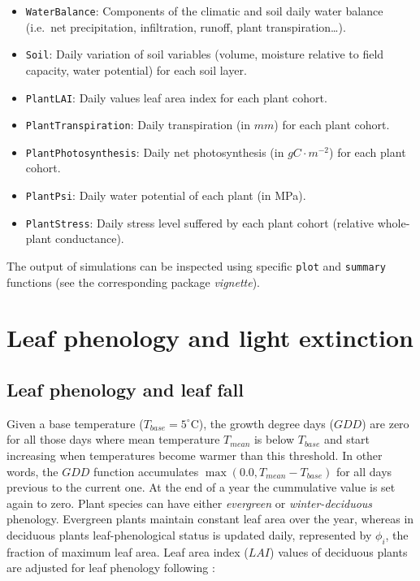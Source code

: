 \documentclass[]{book}
\providecommand{\tightlist}{%
  \setlength{\itemsep}{0pt}\setlength{\parskip}{0pt}}
\begin{document}
\begin{itemize}
\tightlist
\item
  \texttt{WaterBalance}: Components of the climatic and soil daily water
  balance (i.e.~net precipitation, infiltration, runoff, plant
  transpiration\ldots{}).
\item
  \texttt{Soil}: Daily variation of soil variables (volume, moisture
  relative to field capacity, water potential) for each soil layer.
\item
  \texttt{PlantLAI}: Daily values leaf area index for each plant cohort.
\item
  \texttt{PlantTranspiration}: Daily transpiration (in \(mm\)) for each
  plant cohort.
\item
  \texttt{PlantPhotosynthesis}: Daily net photosynthesis (in
  \(g C \cdot m^{-2}\)) for each plant cohort.
\item
  \texttt{PlantPsi}: Daily water potential of each plant (in MPa).
\item
  \texttt{PlantStress}: Daily stress level suffered by each plant cohort
  (relative whole-plant conductance).
\end{itemize}

The output of simulations can be inspected using specific \texttt{plot}
and \texttt{summary} functions (see the corresponding package
\emph{vignette}).

\chapter{Leaf phenology and light extinction}\label{leafphenologylight}

\section{Leaf phenology and leaf fall}\label{leafphenology}

Given a base temperature (\(T_{base} = 5^{\circ} \mathrm{C}\)), the
growth degree days (\(GDD\)) are zero for all those days where mean
temperature \(T_{mean}\) is below \(T_{base}\) and start increasing when
temperatures become warmer than this threshold. In other words, the
\(GDD\) function accumulates \(\max(0.0, T_{mean} - T_{base})\) for all
days previous to the current one. At the end of a year the cummulative
value is set again to zero. Plant species can have either
\emph{evergreen} or \emph{winter-deciduous} phenology. Evergreen plants
maintain constant leaf area over the year, whereas in deciduous plants
leaf-phenological status is updated daily, represented by \(\phi_i\),
the fraction of maximum leaf area. Leaf area index (\(LAI\)) values of
deciduous plants are adjusted for leaf phenology following
\citep{Prentice1993, Sitch2003}:
\end{document}
